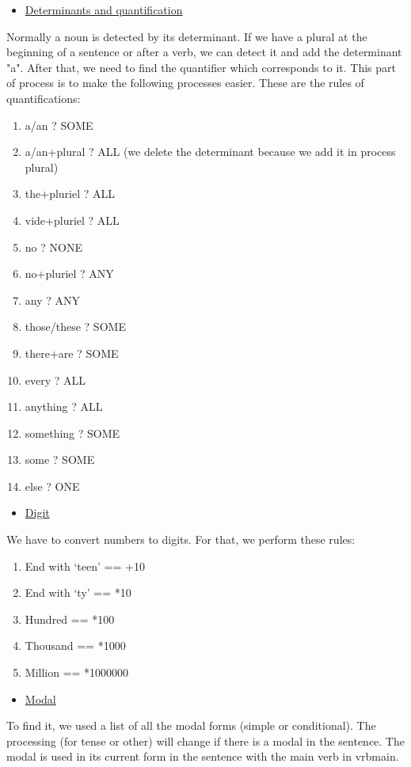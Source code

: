 \documentclass[twoside,a4paper,10pt]{report}
\begin{document}
\begin{itemize}
    \item  \underline{Determinants and quantification}
\end{itemize}
Normally a noun is detected by its determinant. If we have a plural at the beginning of a sentence or after a verb, we can detect it and add the determinant "a". After that, we need to find the quantifier which corresponds to it. This part of process is to make the following processes easier. These are the rules of quantifications:


\begin{enumerate}    \item  a/an ? SOME
    \item  a/an+plural ? ALL (we delete the determinant because we add it in process plural)
    \item  the+pluriel ? ALL
    \item  vide+pluriel ? ALL
    \item  no ? NONE
    \item  no+pluriel ? ANY
    \item  any ? ANY
    \item  those/these ? SOME
    \item  there+are ? SOME
    \item  every ? ALL
    \item  anything ? ALL
    \item  something ? SOME
    \item  some ? SOME
    \item  else ? ONE
\end{enumerate}

\begin{itemize}
    \item  \underline{Digit}
\end{itemize}
We have to convert numbers to digits. For that, we perform these rules:


\begin{enumerate}    \item  End with ‘teen’ == +10
    \item  End with ‘ty’   == *10
    \item  Hundred         == *100
    \item  Thousand        == *1000
    \item  Million         == *1000000
\end{enumerate}

\begin{itemize}
    \item  \underline{Modal}
\end{itemize}
To find it, we used a list of all the modal forms (simple or conditional).
The processing (for tense or other) will change if there is a modal in the sentence. The modal is used in its current form in the sentence with the main verb in vrb{\textunderscore}main.
\end{document}
